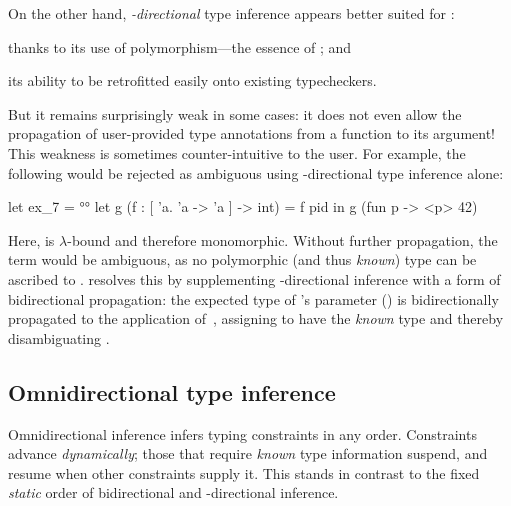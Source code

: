 \documentclass[acmsmall,screen,nonacm%
\Anonymous{,anonymous}{}%
\Final{}{,review}%
]{acmart}
\begin{document}
On the other hand, \emph{\geninst-directional} type inference appears better
suited for \ML: %
\begin{enumerate*}
    \item thanks to its use of polymorphism---the essence of \ML; and
    \item its ability to be retrofitted easily onto existing typecheckers.
\end{enumerate*}
But it remains surprisingly weak in some cases: it does not even allow the
propagation of user-provided type annotations from a function to its argument!
This weakness is sometimes counter-intuitive to the user. For example, the
following would be rejected as ambiguous using \geninst-directional type
inference alone:
\begin{program}
let ex_7 = °°
  let g (f : [ 'a. 'a -> 'a ] -> int) = f pid in
  g (fun p -> <p> 42)
\end{program}
Here,  is $\lambda$-bound and therefore monomorphic. Without further
propagation, the term  would be ambiguous, as no polymorphic (and
thus \emph{known}) type can be ascribed to . \OCaml resolves this by
supplementing \geninst-directional inference with a form of bidirectional
propagation: the expected type of 's parameter () is
bidirectionally propagated to the application of~, assigning
 to have the \emph{known} type \code{[ 'a. 'a -> 'a ]} and thereby
disambiguating .

\subsection{Omnidirectional type inference}
\label{sec/overview/omni}

%
%
%



Omnidirectional inference infers typing constraints in any order. Constraints
advance \emph{dynamically}; those that require \emph{known} type information
suspend, and resume when other constraints supply it. This stands in contrast
to the fixed \emph{static} order of bidirectional and \geninst-directional
inference.
\end{document}
